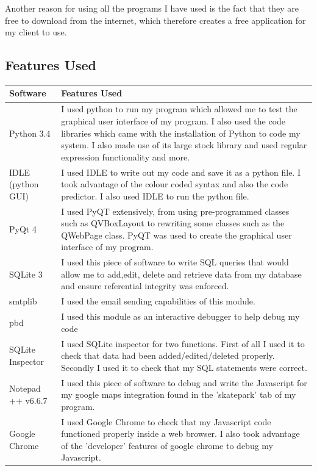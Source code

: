 Another reason for using all the programs I have used is the fact that they are free to download from the internet, which therefore creates a free application for my client to use.

\subsection{Features Used}

\begin{center}
\begin{tabular}{|p{3.5cm}|p{8cm}|} \hline
\textbf{Software} & \textbf{Features Used} \\ \hline
Python 3.4 & I used python to run my program which allowed me to test the graphical user interface of my program. I also used the code libraries which came with the installation of Python to code my system.  I also made use of its large stock library and used regular expression functionality and more.\\ \hline
IDLE (python GUI) & I used IDLE to write out my code and save it as a python file. I took advantage of the colour coded syntax and also the code predictor. I also used IDLE to run the python file.\\ \hline
PyQt 4 & I used PyQT extensively, from using pre-programmed classes such as QVBoxLayout to rewriting some classes such as the QWebPage class. PyQT was used to create the graphical user interface of my program.\\ \hline
SQLite 3 & I used this piece of software to write SQL queries that would allow me to add,edit, delete and retrieve data from my database and ensure referential integrity was enforced. \\ \hline
smtplib & I used the email sending capabilities of this module. \\ \hline
pbd & I used this module as an interactive debugger to help debug my code \\ \hline
SQLite Inspector & I used SQLite inspector for two functions. First of all I used it to check that data had been added/edited/deleted properly. Secondly I used it to check that my SQL statements were correct. \\ \hline
Notepad ++ v6.6.7 & I used this piece of software to debug and write the Javascript for my google maps integration found in the 'skatepark' tab of my program. \\ \hline
Google Chrome & I used Google Chrome to check that my Javascript code functioned properly inside a web browser. I also took advantage of the 'developer' features of google chrome to debug my Javascript.\\ \hline

\end{tabular}
\label{tab:Software Features Used}
\end{center}

